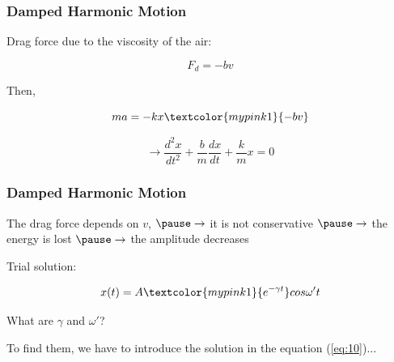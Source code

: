 \documentclass[]{beamer}
\begin{document}

\begin{frame}
\frametitle{Damped Harmonic Motion}
\pause
Drag force
 due to the viscosity of the air:

 \pause

\begin{equation*}
\boxed{F_d=-bv}
\end{equation*}
\pause

Then,

\begin{equation*}
ma=-kx\textcolor{mypink1}{-bv}
\end{equation*}

\pause


\begin{equation}
\rightarrow \boxed{\frac{d^2x}{dt^2}+\frac{b}{m}\frac{dx}{dt}+\frac{k}{m}x=0}
\label{eq:10}
\end{equation}


\end{frame}



\begin{frame}
\frametitle{Damped Harmonic Motion}

The drag force depends on $v$, $\pause\rightarrow$ it is  not conservative $\pause\rightarrow$ the energy is lost $\pause\rightarrow$ the amplitude  decreases
\pause

\vspace{3mm}

\pause

Trial solution:

\pause

\begin{equation*}
x(t)=A\textcolor{mypink1}{e^{-\gamma t}}cos\omega' t
\end{equation*}

\pause

What are $\gamma$ and $\omega'$?
\vspace{3mm}

\pause
 To find them, we have to introduce the solution in the equation (\ref{eq:10})...


\end{frame}






\end{document}
